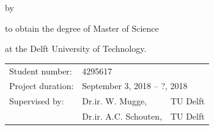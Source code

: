 \begin{titlepage}


\begin{center}


{\makeatletter
\largetitlestyle\fontsize{64}{94}\selectfont\@title
\makeatother}


\bigskip
\bigskip

by

\bigskip
\bigskip

{\makeatletter
\largetitlestyle\fontsize{26}{26}\selectfont\@author
\makeatother}

\bigskip
\bigskip

to obtain the degree of Master of Science

at the Delft University of Technology.


\vfill

\begin{tabular}{lll}
    Student number: & 4295617 \\
    Project duration: & \multicolumn{2}{l}{September 3, 2018 -- ?, 2018} \\
    Supervised by: & Dr.ir. W. Mugge, & TU Delft \\
        & Dr.ir. A.C. Schouten, & TU Delft \\
\end{tabular}


\bigskip
\bigskip


\end{center}
\end{titlepage}
